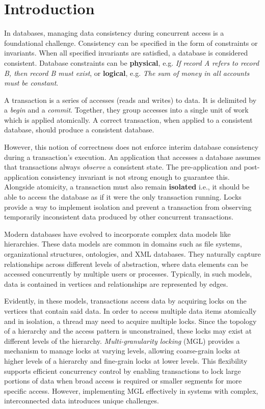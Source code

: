 %


\chapter{Introduction}
\adjustmtc


In databases, managing data consistency during concurrent access is a foundational challenge. 
Consistency can be specified in the form of constraints or invariants. When all specified invariants are satisfied, a database is considered consistent. 
Database constraints can be \textbf{physical}, e.g. \emph{If record A refers to record B, then record B must exist}, or \textbf{logical}, e.g. \emph{The sum of money in all accounts must be constant}.


A transaction is a series of accesses (reads and writes) to data. It is delimited by a \emph{begin} and a \emph{commit}. Together, they group accesses into a single unit of work which is applied atomically.  
A correct transaction, when applied to a consistent database, should produce a consistent database.

However, this notion of correctness does not enforce interim database consistency during a transaction's execution. An application that accesses a database assumes that transactions always \emph{observe} a consistent state.  The pre-application and post-application consistency invariant is not strong enough to guarantee this. Alongside atomicity, a transaction must also remain \textbf{isolated} i.e., it should be able to access the database as if it were the only transaction running. 
Locks provide a way to implement isolation and prevent a transaction from observing temporarily inconsistent data produced by other concurrent transactions. 



Modern databases have evolved to incorporate complex data models like hierarchies. These data models are common in domains such as file systems, organizational structures, ontologies, and XML databases. They naturally capture relationships across different levels of abstraction, where data elements can be accessed concurrently by multiple users or processes. Typically, in such models, data is contained in vertices and relationships are represented by edges.

Evidently, in these models, transactions access data by acquiring locks on the vertices that contain said data. In order to access multiple data items atomically and in isolation, a thread may need to acquire multiple locks. 
Since the topology of a hierarchy and the access pattern is unconstrained, these locks may exist at different levels of the hierarchy.  
\emph{Multi-granularity locking} (MGL) provides a mechanism to manage locks at varying levels, allowing coarse-grain locks at higher levels of a hierarchy and fine-grain locks at lower levels. This flexibility supports efficient concurrency control by enabling transactions to lock large portions of data when broad access is required or smaller segments for more specific access. 
However, implementing MGL effectively in systems with complex, interconnected data introduces unique challenges. 

